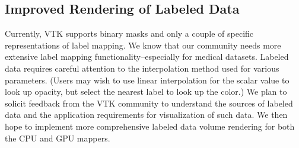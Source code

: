 \subsection{Improved Rendering of Labeled Data}
\label{improved-rendering-of-labeled-data}
Currently, VTK supports binary masks and only a couple of specific
representations of label mapping. We know that our community needs more
extensive label mapping functionality--especially for medical datasets. Labeled
data requires careful attention to the interpolation method used for various
parameters. (Users may wish to use linear interpolation for the scalar value to
look up opacity, but select the nearest label to look up the color.) We plan to
solicit feedback from the VTK community to understand the sources of labeled
data and the application requirements for visualization of such data. We then
hope to implement more comprehensive labeled data volume rendering for both the
CPU and GPU mappers.
